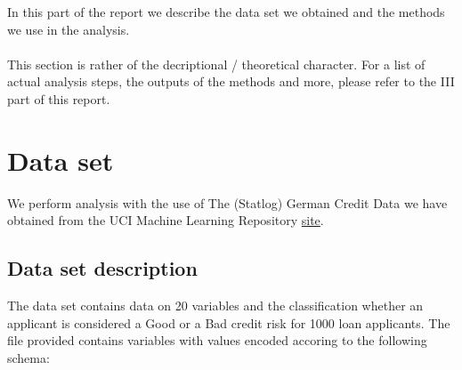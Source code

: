 \documentclass[10pt]{article}\usepackage[]{graphicx}\usepackage[]{color}
\begin{document}
In this part of the report we describe the data set we obtained and the methods we use in the analysis. 

\paragraph{}
This section is rather of the decriptional / theoretical character. For a list of actual analysis steps, the outputs of the methods and more, please refer to the III part of this report.  



\section{Data set}
We perform analysis with the use of The (Statlog) German Credit Data we have obtained from the UCI Machine Learning Repository \href{http://archive.ics.uci.edu/ml/datasets/Statlog+(German+Credit+Data)}{site}. 


\subsection{Data set description}
The data set contains data on 20 variables and the classification whether an applicant is considered a Good or a Bad credit risk for 1000 loan applicants. The file provided contains variables with values encoded accoring to the following schema: 
\end{document}
